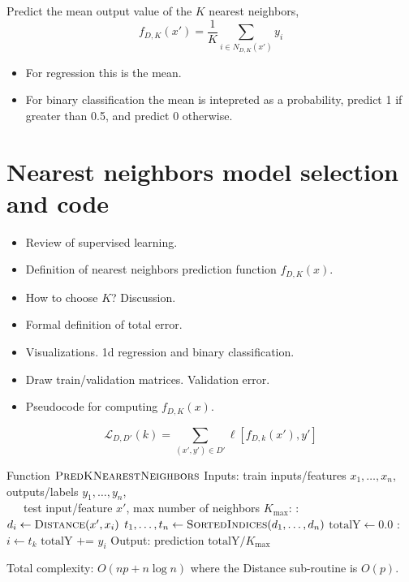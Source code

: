 \documentclass{article}
\begin{document}
Predict the mean output value of the $K$ nearest
neighbors, $$f_{D,K}(x') = \frac 1 K \sum_{i\in N_{D,K}(x')} y_i$$

\begin{itemize}
\item For regression this is the mean.
\item For binary classification the mean is intepreted as a
  probability, predict 1 if greater than 0.5, and predict 0 otherwise.
\end{itemize}

\section{Nearest neighbors model selection and code}
\begin{itemize}
\item Review of supervised learning.
\item Definition of nearest neighbors prediction function $f_{D,K}(x)$.  
\item How to choose $K$? Discussion.
\item Formal definition of total error.
\item Visualizations. 1d regression and binary classification.
\item Draw train/validation matrices. Validation error.
\item Pseudocode for computing $f_{D,K}(x)$.
\end{itemize}

\begin{equation}
  \mathcal L_{D,D'}(k) = \sum_{(x',y')\in D'} \ell[f_{D,k}(x'), y']
\end{equation}

\begin{algorithmic}[1]
  \State Function $\textsc{PredKNearestNeighbors}$
  \State Inputs: train inputs/features $x_1,\dots,x_n$, outputs/labels $y_1,\dots,y_n$,\\ \ \ \ test input/feature $x'$, max number of neighbors $K_{\text{max}}$:
  :
  \State $d_i\gets \textsc{Distance}(x', x_i)$
  \EndFor
  \State $t_1,\dots,t_n\gets \textsc{SortedIndices}(d_1,\dots,d_n)$
  \State $\text{totalY}\gets 0.0$
  :
  \State $i\gets t_k$
  \State $\text{totalY} \texttt{ += } y_i$
  \EndFor
  \State Output: prediction $\text{totalY}/K_{\text{max}}$
\end{algorithmic}
Total complexity: $O(np + n\log n)$ where the Distance sub-routine is $O(p)$.
\end{document}

